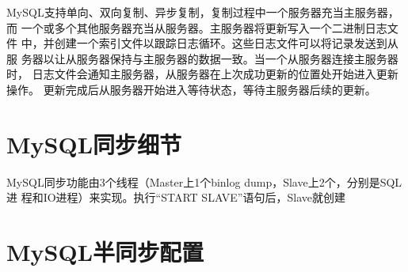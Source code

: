 MySQL支持单向、双向复制、异步复制，复制过程中一个服务器充当主服务器，而
一个或多个其他服务器充当从服务器。主服务器将更新写入一个二进制日志文件
中，并创建一个索引文件以跟踪日志循环。这些日志文件可以将记录发送到从服
务器以让从服务器保持与主服务器的数据一致。当一个从服务器连接主服务器时，
日志文件会通知主服务器，从服务器在上次成功更新的位置处开始进入更新操作。
更新完成后从服务器开始进入等待状态，等待主服务器后续的更新。

\section{MySQL同步细节}

MySQL同步功能由3个线程（Master上1个binlog dump，Slave上2个，分别是SQL进
程和IO进程）来实现。执行“START SLAVE”语句后，Slave就创建

\section{MySQL半同步配置}

